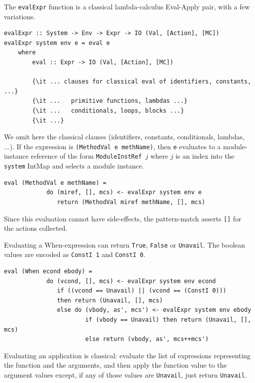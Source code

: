 \documentclass[11pt]{article}
\newcommand{\term}[1]{\texttt{#1}}
\begin{document}
The \term{evalExpr} function is a classical lambda-calculus Eval-Apply
pair, with a few variations.

\begin{Verbatim}[frame=single, commandchars=\\\{\}]
evalExpr :: System -> Env -> Expr -> IO (Val, [Action], [MC])
evalExpr system env e = eval e
    where
        eval :: Expr -> IO (Val, [Action], [MC])

        {\it ... clauses for classical eval of identifiers, constants, ...}
        {\it ...   primitive functions, lambdas ...}
        {\it ...   conditionals, loops, blocks ...}
        {\it ...}
\end{Verbatim}

We omit here the classical clauses (identifiers, constants,
conditionals, lambdas, ...).  If the expression is \verb|(MethodVal e methName)|,
then \term{e} evaluates to a module-instance reference of
the form \term{ModuleInstRef}~$j$ where $j$ is an index into the
\term{system} IntMap and selects a module instance.

\begin{Verbatim}[frame=single, commandchars=\\\{\}]
        eval (MethodVal e methName) =
            do (miref, [], mcs) <- evalExpr system env e
               return (MethodVal miref methName, [], mcs)
\end{Verbatim}

Since this evaluation cannot have side-effects, the pattern-match
asserts \term{[]} for the actions collected.

Evaluating a When-expression can return \term{True}, \term{False} or
\term{Unavail}.  The boolean values are encoded as \verb|ConstI 1| and
\verb|ConstI 0|.

\begin{Verbatim}[frame=single, commandchars=\\\{\}]
        eval (When econd ebody) =
            do (vcond, [], mcs) <- evalExpr system env econd
               if ((vcond == Unavail) || (vcond == (ConstI 0)))
               then return (Unavail, [], mcs)
               else do (vbody, as', mcs') <- evalExpr system env ebody
                       if (vbody == Unavail) then return (Unavail, [], mcs)
                       else return (vbody, as', mcs++mcs')
\end{Verbatim}

Evaluating an application is classical: evaluate the list of
expressions representing the function and the arguments, and then
apply the function value to the argument values except, if any of
those values are \term{Unavail}, just return \term{Unavail}.
\end{document}
